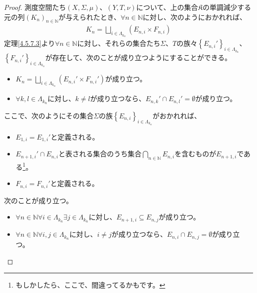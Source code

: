 \documentclass[dvipdfmx]{jsarticle}
\begin{document}
\begin{proof}
測度空間たち$(X,\varSigma,\mu)$、$(Y,T,\nu)$について、上の集合$\mathfrak{K}$の単調減少する元の列$\left( K_{n} \right)_{n \in \mathbb{N}}$が与えられたとき、$\forall n \in \mathbb{N}$に対し、次のようにおかれれば、
\begin{align*}
K_{n} = \bigsqcup_{i \in \varLambda_{k_{n}}} \left( E_{n,i} \times F_{n,i} \right)
\end{align*}
定理\ref{4.5.7.3}より$\forall n \in \mathbb{N}$に対し、それらの集合たち$\varSigma$、$T$の族々$\left\{ E_{n,i}' \right\}_{i \in \varLambda_{k_{n}}}$、$\left\{ F_{n,i}' \right\}_{i \in \varLambda_{k_{n}}}$が存在して、次のことが成り立つようにすることができる。
\begin{itemize}
\item
  $K_{n} = \bigsqcup_{i \in \varLambda_{k_{n}}} \left( E_{n,i}' \times F_{n,i}' \right)$が成り立つ。
\item
  $\forall k,l \in \varLambda_{k_{n}}$に対し、$k \neq l$が成り立つなら、$E_{n,k}' \cap E_{n,l}' = \emptyset$が成り立つ。
\end{itemize}
ここで、次のようにその集合$\varSigma$の族$\left\{ E_{n,i} \right\}_{i \in \varLambda_{k_{n}}}$がおかれれば、
\begin{itemize}
\item
  $E_{1,i} = E_{1,i}'$と定義される。
\item
  $E_{n + 1,i}' \cap E_{n,i}$と表される集合のうち集合$\bigcap_{n \in \mathbb{N}} E_{n,i}$を含むものが$E_{n + 1,i}$である\footnote{もしかしたら、ここで、間違ってるかもです。}。
\item
  $F_{n,i} = F_{n,i}'$と定義される。
\end{itemize}
次のことが成り立つ。
\begin{itemize}
\item
  $\forall n \in \mathbb{N}\forall i \in \varLambda_{k_{n}}\exists j \in \varLambda_{k_{n}}$に対し、$E_{n + 1,i} \subseteq E_{n,j}$が成り立つ。
\item
  $\forall n \in \mathbb{N}\forall i,j \in \varLambda_{k_{n}}$に対し、$i \neq j$が成り立つなら、$E_{n,i} \cap E_{n,j} = \emptyset$が成り立つ。
\end{itemize}
\end{proof}
\end{document}
